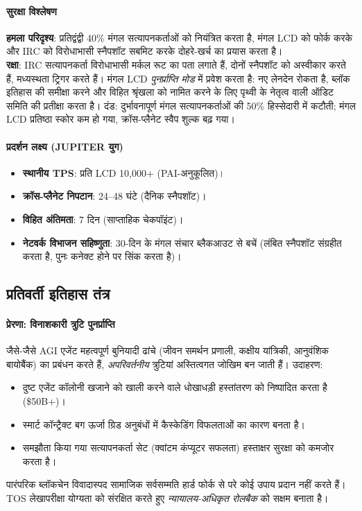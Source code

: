 \documentclass[11pt]{article}
\begin{document}
\begin{itemize}[noitemsep]
\begin{itemize}[noitemsep]
\paragraph{सुरक्षा विश्लेषण}
\textbf{हमला परिदृश्य}: प्रतिद्वंद्वी 40\% मंगल सत्यापनकर्ताओं को नियंत्रित करता है, मंगल LCD को फोर्क करके और IRC को विरोधाभासी स्नैपशॉट सबमिट करके दोहरे-खर्च का प्रयास करता है।\\
\textbf{रक्षा}: IRC सत्यापनकर्ता विरोधाभासी मर्कल रूट का पता लगाते हैं, दोनों स्नैपशॉट को अस्वीकार करते हैं, मध्यस्थता ट्रिगर करते हैं। मंगल LCD \emph{पुनर्प्राप्ति मोड} में प्रवेश करता है: नए लेनदेन रोकता है, ब्लॉक इतिहास की समीक्षा करने और विहित श्रृंखला को नामित करने के लिए पृथ्वी के नेतृत्व वाली ऑडिट समिति की प्रतीक्षा करता है। दंड: दुर्भावनापूर्ण मंगल सत्यापनकर्ताओं की 50\% हिस्सेदारी में कटौती; मंगल LCD प्रतिष्ठा स्कोर कम हो गया, क्रॉस-प्लैनेट स्वैप शुल्क बढ़ गया।

\paragraph{प्रदर्शन लक्ष्य (JUPITER युग)}
\begin{itemize}[noitemsep]
  \item \textbf{स्थानीय TPS}: प्रति LCD 10,000+ (PAI-अनुकूलित)।
  \item \textbf{क्रॉस-प्लैनेट निपटान}: 24--48 घंटे (दैनिक स्नैपशॉट)।
  \item \textbf{विहित अंतिमता}: 7 दिन (साप्ताहिक चेकपॉइंट)।
  \item \textbf{नेटवर्क विभाजन सहिष्णुता}: 30-दिन के मंगल संचार ब्लैकआउट से बचें (लंबित स्नैपशॉट संग्रहीत करता है, पुनः कनेक्ट होने पर सिंक करता है)।
\end{itemize}

\subsection{प्रतिवर्ती इतिहास तंत्र}

\paragraph{प्रेरणा: विनाशकारी त्रुटि पुनर्प्राप्ति}
जैसे-जैसे AGI एजेंट महत्वपूर्ण बुनियादी ढांचे (जीवन समर्थन प्रणाली, कक्षीय यांत्रिकी, आनुवंशिक बायोबैंक) का प्रबंधन करते हैं, \emph{अपरिवर्तनीय} त्रुटियां अस्तित्वगत जोखिम बन जाती हैं। उदाहरण:
\begin{itemize}[noitemsep]
  \item दुष्ट एजेंट कॉलोनी खजाने को खाली करने वाले धोखाधड़ी हस्तांतरण को निष्पादित करता है (\$50B+)।
  \item स्मार्ट कॉन्ट्रैक्ट बग ऊर्जा ग्रिड अनुबंधों में कैस्केडिंग विफलताओं का कारण बनता है।
  \item समझौता किया गया सत्यापनकर्ता सेट (क्वांटम कंप्यूटर सफलता) हस्ताक्षर सुरक्षा को कमजोर करता है।
\end{itemize}
पारंपरिक ब्लॉकचेन विवादास्पद सामाजिक सर्वसम्मति हार्ड फोर्क से परे कोई उपाय प्रदान नहीं करते हैं। TOS लेखापरीक्षा योग्यता को संरक्षित करते हुए \emph{न्यायालय-अधिकृत रोलबैक} को सक्षम बनाता है।


\end{itemize}
\end{itemize}
\end{document}
